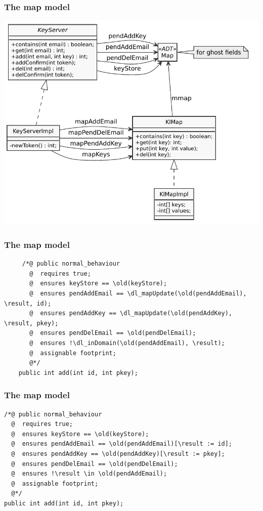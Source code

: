 \documentclass{beamer}
\begin{document}
\begin{frame}
  \frametitle{The map model}
  \centering  \includegraphics[height=.9\textheight]{imap}
\end{frame}

\begin{frame}[fragile]
  \frametitle{The map model}
\begin{lstlisting}
     /*@ public normal_behaviour
       @  requires true;
       @  ensures keyStore == \old(keyStore);
       @  ensures pendAddEmail == \dl_mapUpdate(\old(pendAddEmail), \result, id);
       @  ensures pendAddKey == \dl_mapUpdate(\old(pendAddKey), \result, pkey);
       @  ensures pendDelEmail == \old(pendDelEmail);
       @  ensures !\dl_inDomain(\old(pendAddEmail), \result);
       @  assignable footprint;
       @*/
    public int add(int id, int pkey);
\end{lstlisting}
\end{frame}


\begin{frame}[fragile]
  \frametitle{The map model}
\begin{lstlisting}[mathescape=true]
/*@ public normal_behaviour
  @  requires true;
  @  ensures keyStore == \old(keyStore);
  @  ensures pendAddEmail == \old(pendAddEmail)[\result := id];
  @  ensures pendAddKey == \old(pendAddKey)[\result := pkey];
  @  ensures pendDelEmail == \old(pendDelEmail);
  @  ensures !\result \in \old(pendAddEmail);
  @  assignable footprint;
  @*/
public int add(int id, int pkey);
\end{lstlisting}
\end{frame}
\end{document}
